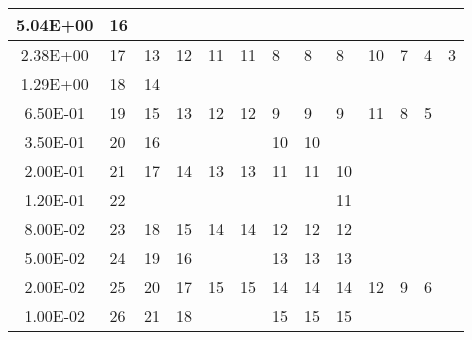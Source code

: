 \begin{table}[htbp!]
\begin{tabular}{c|l|l|l|l|l|l|l|l|l|l|l|l}
  5.04E+00            & 16    &      &      &     &     &     &     &       &     &    &    &   \\ \hline
  2.38E+00            & 17    & 13   & 12   & 11  & 11  & 8   & 8   & 8     & 10  & 7  & 4  & 3 \\ \cline{1-3}
  1.29E+00            & 18    & 14   &      &     &     &     &     &       &     &    &    &   \\ \cline{1-12} 
  6.50E-01            & 19    & 15   & 13   & 12  & 12  & 9   & 9   & 9     & 11  & 8  & 5  &   \\ \cline{1-3} \cline{7-8}
  3.50E-01            & 20    & 16   &      &     &     & 10  & 10  &       &     &    &    &   \\ \cline{1-9}
  2.00E-01            & 21    & 17   & 14   & 13  & 13  & 11  & 11  & 10    &     &    &    &   \\ \cline{1-2} \cline{9-9}
  1.20E-01            & 22    &      &      &     &     &     &     & 11    &     &    &    &   \\ \cline{1-9} 
  8.00E-02            & 23    & 18   & 15   & 14  & 14  & 12  & 12  & 12    &     &    &    &   \\ \cline{1-4} \cline{7-9}
  5.00E-02            & 24    & 19   & 16   &     &     & 13  & 13  & 13    &     &    &    &   \\ \hline
  2.00E-02            & 25    & 20   & 17   & 15  & 15  & 14  & 14  & 14    & 12  & 9  & 6  &   \\ \cline{1-4} \cline{7-9}
  1.00E-02            & 26    & 21   & 18   &     &     & 15  & 15  & 15    &     &    &    &   \\
  \bottomrule
  \end{tabular}
  \label{tab:energygroups}
\end{table}